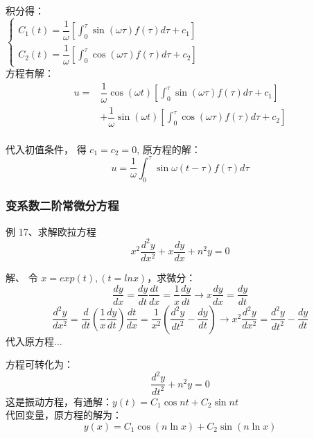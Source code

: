 \begin{frame}
	积分得：\\  
	$\displaystyle \begin{cases}
		C_1(t)=\dfrac{1}{\omega} [\int_{0}^{\tau} \sin(\omega \tau) f(\tau)  d\tau +c_1 ]\\ 
		C_2(t)=\dfrac{1}{\omega} [\int_{0}^{\tau} \cos(\omega \tau) f(\tau)  d\tau +c_2 ]\
	\end{cases} $ \\ \vspace{0.3cm}
	方程有解：\\
	\begin{align*}
		u=&\dfrac{1}{\omega}\cos(\omega t)[\int_{0}^{\tau} \sin(\omega \tau) f(\tau)  d\tau +c_1 ] \\
		&+\dfrac{1}{\omega} \sin(\omega t) [\int_{0}^{\tau} \cos(\omega \tau) f(\tau)  d\tau +c_2 ]
	\end{align*} \\ \vspace{0.3cm}
	代入初值条件， 得 $c_1=c_2=0$, 原方程的解：\\
	\begin{equation*}
		u=\frac{1}{\omega}\int_{0}^{\tau} \sin\omega (t-\tau)  f(\tau)  d\tau
	\end{equation*}   
\end{frame}

\begin{frame}
\frametitle{变系数二阶常微分方程}
	\begin{exampleblock} 	{例 17、求解欧拉方程}
	\begin{equation*}
		x^2 \frac{d^2 y}{d x^2} +x \frac{d y}{d x} +n^2 y =0 
	\end{equation*}     
	\end{exampleblock}	
	\alert{解、}  令 $x=exp(t) , (t=ln x)$，求微分：\\
	\begin{equation*}
		\frac{d y}{d x}  = 	\frac{d y}{d t}\frac{d t}{d x}= \frac{1}{ x}\frac{d y}{d t}  \to x \frac{d y}{d x}=	\frac{d y}{d t}
    \end{equation*} 
	\begin{equation*}
		\frac{d ^2y}{d x^2}  = 	\frac{d }{d t} ( \frac{1}{ x}\frac{d y}{d t}  )\frac{d t}{d x}=  
		\frac{1}{ x^2}(\frac{d ^2y}{d t^2} -	\frac{d y}{d t})   \to  	x^2 \frac{d^2 y}{d x^2} = \frac{d ^2y}{d t^2} -	\frac{d y}{d t}
	\end{equation*} 
	代入原方程...
\end{frame}

\begin{frame}
	方程可转化为：
	\begin{equation*}
		\frac{d^2 y}{d t^2}  +n^2 y =0 
	\end{equation*}     
	这是振动方程，有通解：$	y(t)=C_1 \cos n t +C_2 \sin n t$ \\
	代回变量，原方程的解为：
	\begin{equation*}
		y(x)=C_1 \cos (n \ln x) +C_2 \sin (n \ln x)
	\end{equation*}    
\end{frame}

